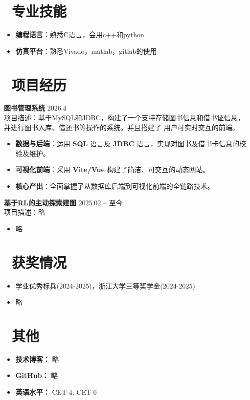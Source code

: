 \documentclass[11pt]{article}
\newlength{\interProjectSpacing}
\newcommand{\projectsep}{\vspace{\interProjectSpacing}}
\newlength{\intraProjectTitleSep}
\newcommand{\titlebreak}{\\[\intraProjectTitleSep]}
\newlength{\intraProjectListTopSep}
\begin{document}
\section{\makebox[\widthof{\faGraduationCap}][c]{\color{CVBlue}\faList}\ 专业技能}
\begin{itemize}
    \item \textbf{编程语言}：熟悉C语言，会用c++和python
    \item \textbf{仿真平台}：熟悉Vivado，matlab，gitlab的使用
\end{itemize}

\section{\makebox[\widthof{\faUsers}][c]{\color{CVBlue}\faUsers}\ 项目经历}

\textbf{图书管理系统} \hfill 2026.4 \titlebreak
项目描述：基于MySQL和JDBC，构建了一个支持存储图书信息和借书证信息，并进行图书入库、借还书等操作的系统。并且搭建了
        用户可实时交互的前端。
\begin{itemize}[nosep, topsep=\intraProjectListTopSep]
    \item \textbf{数据与后端}：运用 \textbf{SQL} 语言及 \textbf{JDBC} 语言，实现对图书及借书卡信息的校验及维护。
    \item \textbf{可视化前端}：采用 \textbf{Vite/Vue} 构建了简洁、可交互的动态网站。
    \item \textbf{核心产出}：全面掌握了从数据库后端到可视化前端的全链路技术。
\end{itemize}

\projectsep

\textbf{基于RL的主动探索建图} \hfill 2025.02 -- 至今 \titlebreak
项目描述：略
\begin{itemize}[nosep, topsep=\intraProjectListTopSep]
    \item 略
\end{itemize}


\section{\makebox[\widthof{\faGraduationCap}][c]{\color{CVBlue}\faList}\ 获奖情况}
\begin{itemize}
    \item 学业优秀标兵(2024-2025)，浙江大学三等奖学金(2024-2025)
    \item 略
\end{itemize}
    
\section{\makebox[\widthof{\faInfo}][c]{\color{CVBlue}\faInfo}\ 其他}
\begin{itemize}[parsep=0.5ex]
    \item \textbf{技术博客：} 略
    \item \textbf{GitHub：} 略
    \item \textbf{英语水平：} CET-4, CET-6
\end{itemize}
\end{document}
